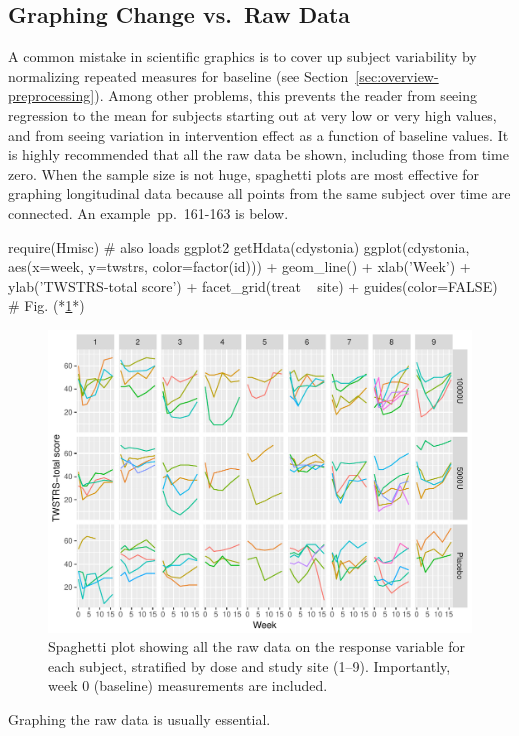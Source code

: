 \subsection{Graphing Change vs.\ Raw Data}\label{sec:descript-change}
A common mistake in scientific graphics is to cover up subject
variability by normalizing repeated measures for baseline (see
Section~\ref{sec:overview-preprocessing}).  Among other problems, this
prevents the reader from seeing regression to the mean for subjects
starting out at very low or very high values, and from seeing
variation in intervention effect as a function of baseline values.  It
is highly recommended that all the raw data be shown, including those
from time zero.  When the sample size is not huge, spaghetti plots are
most effective for graphing longitudinal data because all points from
the same subject over time are connected.  An
example~\citep{davis-repmeas}{pp.\ 161-163} is below. 
\begin{Schunk}
\begin{Sinput}
require(Hmisc)   # also loads ggplot2
getHdata(cdystonia)
ggplot(cdystonia, aes(x=week, y=twstrs, color=factor(id))) +
       geom_line() + xlab('Week') + ylab('TWSTRS-total score') +
       facet_grid(treat ~ site) +
       guides(color=FALSE) # Fig. (*\ref{fig:descript-spaghetti}*)
\end{Sinput}
\begin{figure}[htbp]

\centerline{\includegraphics{descript-spaghetti-1} }

\caption[Spaghetti plot]{Spaghetti plot showing all the raw data on the response variable for each subject, stratified by dose and study site (1--9).  Importantly, week 0 (baseline) measurements are included.}\label{fig:descript-spaghetti}
\end{figure}
\end{Schunk}
Graphing the raw data is usually essential.

